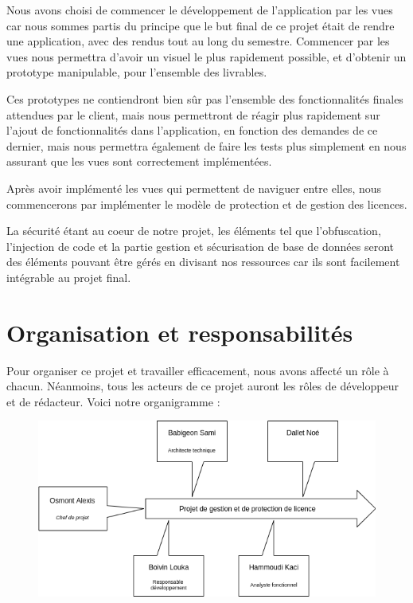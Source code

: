 Nous avons choisi de commencer le développement de l’application par les vues car
nous sommes partis du principe que le but final de ce projet était de rendre une application,
avec des rendus tout au long du semestre. Commencer par les vues nous permettra d’avoir
un visuel le plus rapidement possible, et d’obtenir un prototype manipulable, pour l’ensemble
des livrables.\newline

Ces prototypes ne contiendront bien sûr pas l’ensemble des fonctionnalités finales
attendues par le client, mais nous permettront de réagir plus rapidement sur l’ajout de
fonctionnalités dans l’application, en fonction des demandes de ce dernier, mais nous
permettra également de faire les tests plus simplement en nous assurant que
les vues sont correctement implémentées.\newline

Après avoir implémenté les vues qui permettent de naviguer entre elles, nous
commencerons par implémenter le modèle de protection et de gestion des licences.\newline

La sécurité étant au coeur de notre projet, les éléments tel que l'obfuscation, l'injection de code
et la partie gestion et sécurisation de base de données seront des éléments pouvant être gérés en
divisant nos ressources car ils sont facilement intégrable au projet final.

\chapter{Organisation et responsabilités}

Pour organiser ce projet et travailler efficacement, nous avons affecté un rôle à
chacun. Néanmoins, tous les acteurs de ce projet auront les rôles de développeur et de
rédacteur. Voici notre organigramme :\newline

\begin{figure}[!h]
    \centering
    \includegraphics[width=15cm]{schema_role_projet.png}
\end{figure}

